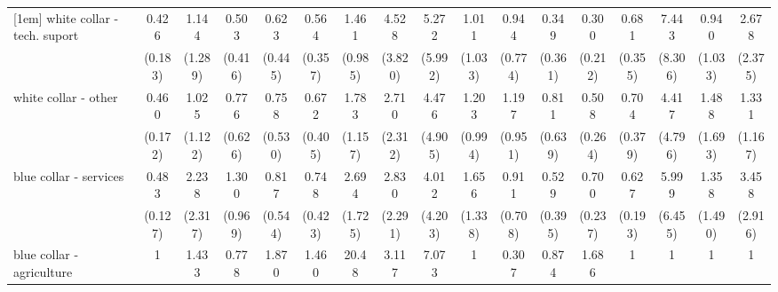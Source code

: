 {\begin{tabular}{l*{16}{c}}
[1em]
white collar - tech. suport&       0.426\sym{*}  &       1.144         &       0.503         &       0.623         &       0.564         &       1.461         &       4.528         &       5.272         &       1.011         &       0.944         &       0.349         &       0.300         &       0.681         &       7.443         &       0.940         &       2.678         \\
                    &     (0.183)         &     (1.289)         &     (0.416)         &     (0.445)         &     (0.357)         &     (0.985)         &     (3.820)         &     (5.992)         &     (1.033)         &     (0.774)         &     (0.361)         &     (0.212)         &     (0.355)         &     (8.306)         &     (1.033)         &     (2.375)         \\
[1em]
white collar - other&       0.460\sym{*}  &       1.025         &       0.776         &       0.758         &       0.672         &       1.783         &       2.710         &       4.476         &       1.203         &       1.197         &       0.811         &       0.508         &       0.704         &       4.417         &       1.488         &       1.331         \\
                    &     (0.172)         &     (1.122)         &     (0.626)         &     (0.530)         &     (0.405)         &     (1.157)         &     (2.312)         &     (4.905)         &     (0.994)         &     (0.951)         &     (0.639)         &     (0.264)         &     (0.379)         &     (4.796)         &     (1.693)         &     (1.167)         \\
[1em]
blue collar - services&       0.483\sym{**} &       2.238         &       1.300         &       0.817         &       0.748         &       2.694         &       2.830         &       4.012         &       1.656         &       0.911         &       0.529         &       0.700         &       0.627         &       5.999         &       1.358         &       3.458         \\
                    &     (0.127)         &     (2.317)         &     (0.969)         &     (0.544)         &     (0.423)         &     (1.725)         &     (2.291)         &     (4.203)         &     (1.338)         &     (0.708)         &     (0.395)         &     (0.237)         &     (0.193)         &     (6.455)         &     (1.490)         &     (2.916)         \\
[1em]
blue collar - agriculture&           1         &       1.433         &       0.778         &       1.870         &       1.460         &       20.48\sym{***}&       3.117         &       7.073         &           1         &       0.307         &       0.874         &       1.686         &           1         &           1         &           1         &           1         \\

\end{tabular}}
